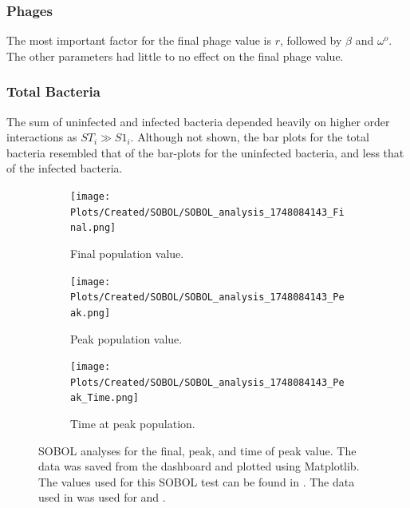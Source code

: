 \subsubsection{Phages}
The most important factor for the final phage value is $r$, followed by $\beta$ and $\omega^o$. 
The other parameters had little to no effect on the final phage value. 

\subsubsection{Total Bacteria}
The sum of uninfected and infected bacteria depended heavily on higher order interactions as $ST_i \gg S1_i$. 
Although not shown, the bar plots for the total bacteria resembled that of the bar-plots for the uninfected bacteria, and less that of the infected bacteria. 

\begin{figure}[h!]
    \centering
    \begin{subfigure}{0.32\linewidth}
        \centering
        \captionsetup{width=1\linewidth}
        \texttt{[image: Plots/Created/SOBOL/SOBOL\_analysis\_1748084143\_Final.png]}
        \caption{
            Final population value. 
        }
        \label{fig:created:SOBOL_final}
    \end{subfigure}
    \hfill
    \begin{subfigure}{0.32\linewidth}
        \centering
        \captionsetup{width=1\linewidth}
        \texttt{[image: Plots/Created/SOBOL/SOBOL\_analysis\_1748084143\_Peak.png]}
        \caption{
            Peak population value. 
        }
        \label{fig:created:SOBOL_peak}
    \end{subfigure}
    \hfill
    \begin{subfigure}{0.32\linewidth}
        \centering
        \captionsetup{width=1\linewidth}
        \texttt{[image: Plots/Created/SOBOL/SOBOL\_analysis\_1748084143\_Peak\_Time.png]}
        \caption{
            Time at peak population. 
        }
        \label{fig:created:SOBOL_peak_time}
    \end{subfigure}
    \caption{
        SOBOL analyses for the final, peak, and time of peak value. 
        The data was saved from the dashboard and plotted using Matplotlib. 
        The values used for this SOBOL test can be found in . 
        The data used in  was used for  and . 
    }
    \label{fig:created:SOBOL_analyses}
\end{figure}

